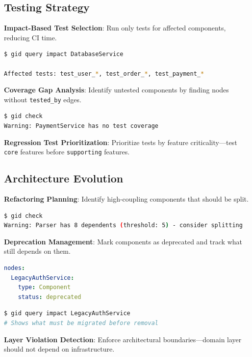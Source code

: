 \documentclass[11pt,a4paper]{article}
\begin{document}
\subsection{Testing Strategy}

\textbf{Impact-Based Test Selection}: Run only tests for affected components, reducing CI time.

\begin{lstlisting}[language=bash]
$ gid query impact DatabaseService

Affected tests: test_user_*, test_order_*, test_payment_*
\end{lstlisting}

\textbf{Coverage Gap Analysis}: Identify untested components by finding nodes without \texttt{tested\_by} edges.

\begin{lstlisting}[language=bash]
$ gid check
Warning: PaymentService has no test coverage
\end{lstlisting}

\textbf{Regression Test Prioritization}: Prioritize tests by feature criticality---test \texttt{core} features before \texttt{supporting} features.

\subsection{Architecture Evolution}

\textbf{Refactoring Planning}: Identify high-coupling components that should be split.

\begin{lstlisting}[language=bash]
$ gid check
Warning: Parser has 8 dependents (threshold: 5) - consider splitting
\end{lstlisting}

\textbf{Deprecation Management}: Mark components as deprecated and track what still depends on them.

\begin{lstlisting}[language=yaml]
nodes:
  LegacyAuthService:
    type: Component
    status: deprecated
\end{lstlisting}

\begin{lstlisting}[language=bash]
$ gid query impact LegacyAuthService
# Shows what must be migrated before removal
\end{lstlisting}

\textbf{Layer Violation Detection}: Enforce architectural boundaries---domain layer should not depend on infrastructure.
\end{document}
